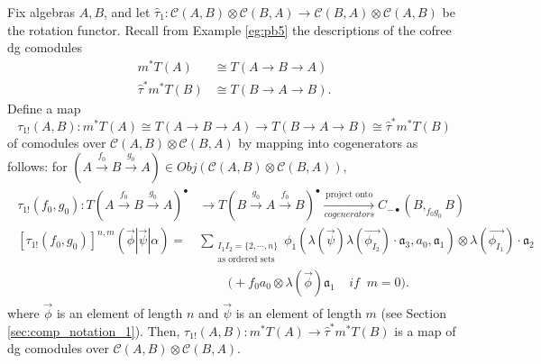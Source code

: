 \begin{prop}
\label{prop:c1}
Fix algebras $A,B$, and let 
$\hat{\tau}_1: \mathcal{C}(A,B) \otimes 
\mathcal{C}(B,A) \to \mathcal{C}(B,A) \otimes 
\mathcal{C}(A,B)$ be the rotation functor.
Recall from Example \ref{eg:pb5} 
the descriptions of the cofree dg comodules 
\begin{align*}
m^*T(A) &\cong T(A \to B \to A) \\
\hat{\tau}^*m^*T(B) &\cong T(B \to A \to B).
\end{align*}
Define a map 
$$
\tau_{1!}(A,B): m^*T(A) \cong T(A \to B \to A) 
\longrightarrow
T(B \to A \to B) \cong \hat{\tau}^*m^*T(B) 
$$
of comodules over $\mathcal{C}(A,B) \otimes 
\mathcal{C}(B,A)$ by mapping into 
cogenerators as follows: for 
$(A \overset{f_0}{\to} B \overset{g_0}{\to} A) \in Obj(\mathcal{C}(A,B) \otimes 
\mathcal{C}(B,A))$,
\begin{align}\label{eq:define_upsilon}
\begin{split}
\tau_{1!}(f_0, g_0): 
T(A \overset{f_0}{\to} B \overset{g_0}{\to} A)^\bullet
&\to 
T(B \overset{g_0}{\to} A \overset{f_0}{\to} B)^\bullet
\xrightarrow[cogenerators]{\textrm{project onto}}
C_{-\bullet}(B, _{f_0g_0}B)\\
[\tau_{1!}(f_0,g_0)]^{n,m}
(\vec{\phi} | \vec{\psi} | \alpha) = 
& \sum_{\substack{I_1I_2 = \{2,\cdots,n\} \\
                          \textrm{as ordered sets}}}
  \phi_1(\lambda(\vec{\psi})\lambda(\vec{\phi_{I_2}})\cdot \mathfrak{a}_3, a_0, \mathfrak{a}_1) \otimes \lambda(\vec{\phi_{I_1}}) \cdot \mathfrak{a}_2 \\
&\phantom{{}move{}}
\bigg( + f_0a_0 \otimes \lambda(\vec{\phi}) \mathfrak{a}_1 
  \; \; \; \; if \; \; m = 0 \bigg).
\end{split}
\end{align}
where $\vec{\phi}$ is an element of length $n$ and 
$\vec{\psi}$ is an element of length $m$ (see 
Section \ref{sec:comp_notation_1}).
Then, $\tau_{1!}(A,B): m^*T(A)
\to \hat{\tau}^*m^*T(B)$ 
is a map of dg comodules over 
$\mathcal{C}(A,B) \otimes 
\mathcal{C}(B,A)$.
\end{prop}
%

